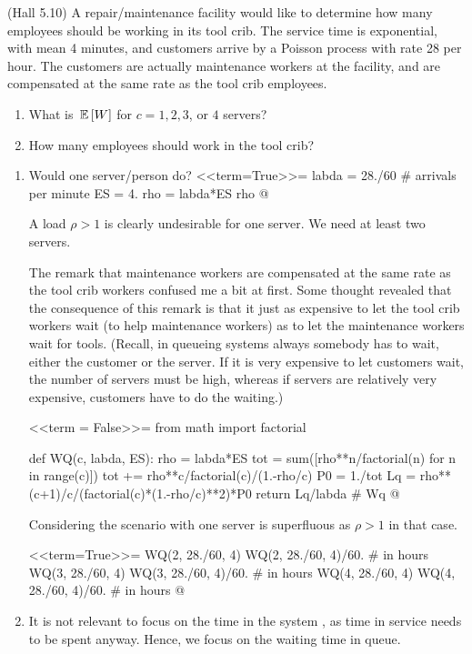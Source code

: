 \begin{question}
  (Hall 5.10) A repair/maintenance facility would like to determine
  how many employees should be working in its tool crib. The service
  time is exponential, with mean 4 minutes, and customers arrive by a
  Poisson process with rate 28 per hour. The customers are actually
  maintenance workers at the facility, and are compensated at the same
  rate as the tool crib employees.
  \begin{enumerate}
  \item What is $\,\mathbb{E}\left[W\right]$ for $c=1, 2, 3$, or $4$ servers?
  \item How many employees should work in the tool crib?
  \end{enumerate}

  \begin{solution}
    \begin{enumerate}
    \item 
      Would one server/person do? 
<<term=True>>=
labda = 28./60 # arrivals per minute
ES = 4.
rho = labda*ES
rho
@ 

A load $\rho>1$ is clearly undesirable for one server.  We need at
least two servers.

The remark that maintenance workers are compensated at the same rate
as the tool crib workers confused me a bit at first.  Some thought
revealed that the consequence of this remark is that it just as
expensive to let the tool crib workers wait (to help maintenance
workers) as to let the maintenance workers wait for tools. (Recall, in
queueing systems always somebody has to wait, either the customer or
the server. If it is very expensive to let customers wait, the number
of servers must be high, whereas if servers are relatively very
expensive, customers have to do the waiting.)

<<term = False>>=
from math import factorial

def WQ(c, labda, ES):
    rho = labda*ES
    tot = sum([rho**n/factorial(n) for n in range(c)])
    tot += rho**c/factorial(c)/(1.-rho/c)
    P0 = 1./tot
    Lq = rho**(c+1)/c/(factorial(c)*(1.-rho/c)**2)*P0
    return Lq/labda # Wq
@ 

Considering the scenario with one server is superfluous as $\rho>1$ in
that case.

<<term=True>>=
WQ(2, 28./60, 4)
WQ(2, 28./60, 4)/60. # in hours
WQ(3, 28./60, 4)
WQ(3, 28./60, 4)/60. # in hours
WQ(4, 28./60, 4)
WQ(4, 28./60, 4)/60. # in hours
@ 

\item It is not relevant to focus on the time in the system , as time
  in service needs to be spent anyway. Hence, we focus on the waiting
  time in queue.


\end{enumerate}
\end{solution}
\end{question}
